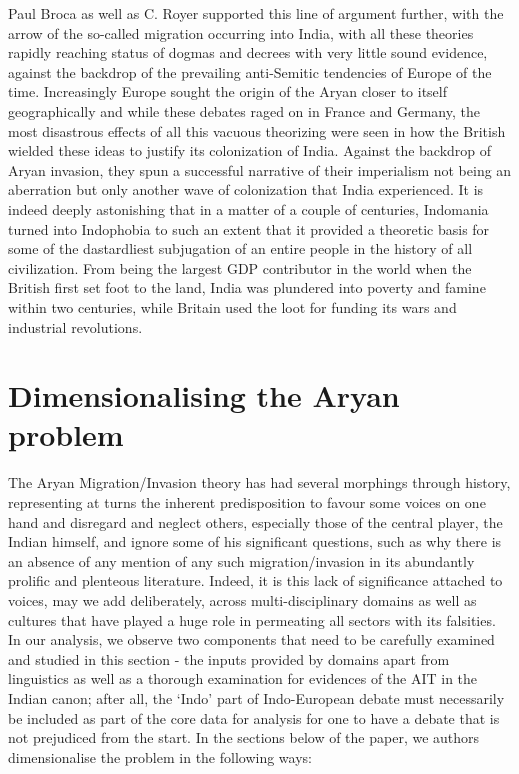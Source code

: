 Paul Broca as well as C. Royer supported this line of argument further, with the arrow of the so-called migration occurring into India, with all these theories rapidly reaching status of dogmas and decrees with very little sound evidence, against the backdrop of the prevailing anti-Semitic tendencies of Europe of the time. Increasingly Europe sought the origin of the Aryan closer to itself geographically and while these debates raged on in France and Germany, the most disastrous effects of all this vacuous theorizing were seen in how the British wielded these ideas to justify its colonization of India. Against the backdrop of Aryan invasion, they spun a successful narrative of their imperialism not being an aberration but only another wave of colonization that India experienced. It is indeed deeply astonishing that in a matter of a couple of centuries, Indomania turned into Indophobia to such an extent that it provided a theoretic basis for some of the dastardliest subjugation of an entire people in the history of all civilization. From being the largest GDP contributor in the world when the British first set foot to the land, India was plundered into poverty and famine within two centuries, while Britain used the loot for funding its wars and industrial revolutions.


\section{Dimensionalising the Aryan problem}

The Aryan Migration/Invasion theory has had several morphings through history, representing at turns the inherent predisposition to favour some voices on one hand and disregard and neglect others, especially those of the central player, the Indian himself, and ignore some of his significant questions, such as why there is an absence of any mention of any such migration/invasion in its abundantly prolific and plenteous literature. Indeed, it is this lack of significance attached to voices, may we add deliberately, across multi-disciplinary domains as well as cultures that have played a huge role in permeating all sectors with its falsities. In our analysis, we observe two components that need to be carefully examined and studied in this section - the inputs provided by domains apart from linguistics as well as a thorough examination for evidences of the AIT in the Indian canon; after all, the ‘Indo’ part of Indo-European debate must necessarily be included as part of the core data for analysis for one to have a debate that is not prejudiced from the start. In the sections below of the paper, we authors dimensionalise the problem in the following ways:

